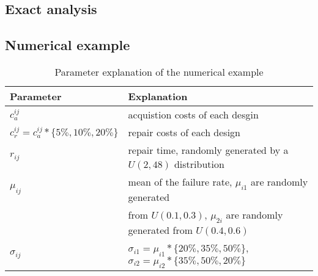 \documentclass[preprint,12pt]{elsarticle}
\begin{document}
\subsection{Exact analysis}
\subsection{Numerical example}
\begin{table}[htbp]
  \centering
  \caption{Parameter explanation of the numerical example}
    \begin{tabular}{ll}
    \toprule
    Parameter & Explanation \\
    \midrule
    $c_{a}^{ij}$ & acquistion costs of each desgin \\
    $c_{r}^{ij}=c_{a}^{ij}*\{5\%, 10\%, 20\%\}$ & repair costs of each design  \\
    $r_{ij}$ & repair time, randomly generated by a $U(2,48)$ distribution  \\
    $\mu_{ij}$ & mean of the failure rate, $\mu_{i1}$ are randomly generated\\
     & from $U(0.1, 0.3)$, $\mu_{2i}$ are randomly generated from $U(0.4, 0.6)$ \\
    $\sigma_{ij}$ & $\sigma_{i1}=\mu_{i1}*\{20\%, 35\%, 50\%\}$, $\sigma_{i2}=\mu_{i2}*\{35\%, 50\%, 20\%\}$ \\
    \bottomrule
    \end{tabular}%
  \label{tab:addlabel}%
\end{table}%
\end{document}

